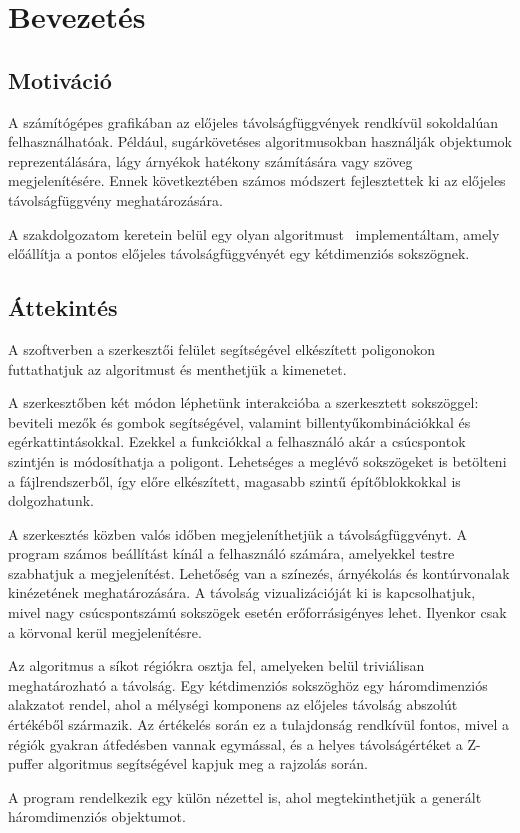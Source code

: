\chapter{Bevezetés}
\label{ch:intro}

\section{Motiváció}\label{sec:motivacio}
A számítógépes grafikában az előjeles távolságfüggvények rendkívül sokoldalúan felhasználhatóak. Például, sugárkövetéses algoritmusokban használják objektumok reprezentálására, lágy árnyékok hatékony számítására vagy szöveg megjelenítésére. Ennek következtében számos módszert fejlesztettek ki az előjeles távolságfüggvény meghatározására.

A szakdolgozatom keretein belül egy olyan algoritmust~\cite{sdfalgorithmpaper} implementáltam, amely előállítja a pontos előjeles távolságfüggvényét egy kétdimenziós sokszögnek.

\section{Áttekintés}\label{sec:attekintes}
A szoftverben a szerkesztői felület segítségével elkészített poligonokon futtathatjuk az algoritmust és menthetjük a kimenetet.

A szerkesztőben két módon léphetünk interakcióba a szerkesztett sokszöggel: beviteli mezők és gombok segítségével, valamint billentyűkombinációkkal és egérkattintásokkal. Ezekkel a funkciókkal a felhasználó akár a csúcspontok szintjén is módosíthatja a poligont. Lehetséges a meglévő sokszögeket is betölteni a fájlrendszerből, így előre elkészített, magasabb szintű építőblokkokkal is dolgozhatunk.

A szerkesztés közben valós időben megjeleníthetjük a távolságfüggvényt. A program számos beállítást kínál a felhasználó számára, amelyekkel testre szabhatjuk a megjelenítést. Lehetőség van a színezés, árnyékolás és kontúrvonalak kinézetének meghatározására. A távolság vizualizációját ki is kapcsolhatjuk, mivel nagy csúcspontszámú sokszögek esetén erőforrásigényes lehet. Ilyenkor csak a körvonal kerül megjelenítésre.

Az algoritmus a síkot régiókra osztja fel, amelyeken belül triviálisan meghatározható a távolság. Egy kétdimenziós sokszöghöz egy háromdimenziós alakzatot rendel, ahol a mélységi komponens az előjeles távolság abszolút értékéből származik. Az értékelés során ez a tulajdonság rendkívül fontos, mivel a régiók gyakran átfedésben vannak egymással, és a helyes távolságértéket a Z-puffer algoritmus segítségével kapjuk meg a rajzolás során.

A program rendelkezik egy külön nézettel is, ahol megtekinthetjük a generált háromdimenziós objektumot.
